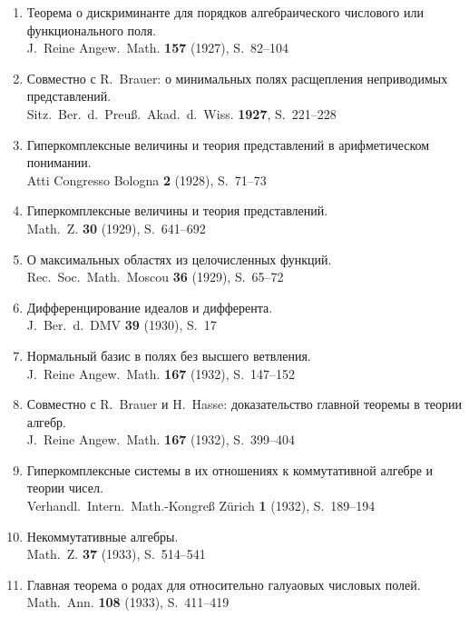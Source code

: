 \documentclass[11pt]{article}
\newcommand{\foreign}[1]{#1}
\begin{document}
\begin{enumerate}[label={\small\arabic*.},leftmargin=2em,itemsep=0.3em]
\item Теорема о дискриминанте для порядков алгебраического числового или функционального поля.\\
\foreign{J.\ Reine Angew.\ Math.} \textbf{157} (1927), S.~82--104

\item Совместно с R.\ Brauer: о минимальных полях расщепления неприводимых представлений.\\
\foreign{Sitz.\ Ber.\ d.\ Preuß.\ Akad.\ d.\ Wiss.} \textbf{1927}, S.~221--228

\item Гиперкомплексные величины и теория представлений в арифметическом понимании.\\
\foreign{Atti Congresso Bologna} \textbf{2} (1928), S.~71--73

\item Гиперкомплексные величины и теория представлений.\\
\foreign{Math.\ Z.} \textbf{30} (1929), S.~641--692

\item О максимальных областях из целочисленных функций.\\
\foreign{Rec.\ Soc.\ Math.\ Moscou} \textbf{36} (1929), S.~65--72

\item Дифференцирование идеалов и дифферента.\\
\foreign{J.\ Ber.\ d.\ DMV} \textbf{39} (1930), S.~17

\item Нормальный базис в полях без высшего ветвления.\\
\foreign{J.\ Reine Angew.\ Math.} \textbf{167} (1932), S.~147--152

\item Совместно с R.\ Brauer и H.\ Hasse: доказательство главной теоремы в теории алгебр.\\
\foreign{J.\ Reine Angew.\ Math.} \textbf{167} (1932), S.~399--404

\item Гиперкомплексные системы в их отношениях к коммутативной алгебре и теории чисел.\\
\foreign{Verhandl.\ Intern.\ Math.-Kongreß Zürich} \textbf{1} (1932), S.~189--194

\item Некоммутативные алгебры.\\
\foreign{Math.\ Z.} \textbf{37} (1933), S.~514--541

\item Главная теорема о родах для относительно галуаовых числовых полей.\\
\foreign{Math.\ Ann.} \textbf{108} (1933), S.~411--419


\end{enumerate}
\end{document}
